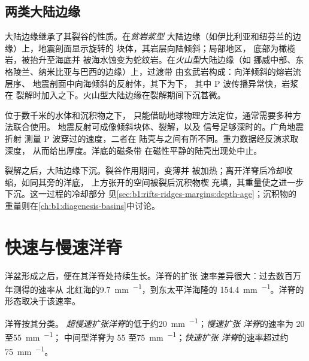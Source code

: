 \subsection*{两类大陆边缘}

大陆边缘继承了其裂谷的性质。在\emph{贫岩浆型}
大陆边缘（如伊比利亚和纽芬兰的边缘）上，地震剖面显示旋转的
块体，其岩层向陆倾斜；局部地区，
底部为橄榄岩，被抬升至海底并
被海水蚀变为蛇纹岩。在\emph{火山型}大陆边缘（如
挪威中部、东格陵兰、纳米比亚与巴西的边缘）上，过渡带
由玄武岩构成：向洋倾斜的熔岩流层序、
地震剖面中向海倾斜的反射体，其下为下，
其中 P 波传播异常快，岩浆在
裂解时加入之下。火山型大陆边缘在裂解期间下沉甚微。

\begin{inthefield}[寻找大陆的边缘]
位于数千米的水体和沉积物之下，
只能借助地球物理方法定位，通常需要多种方法联合使用。
地震反射可成像倾斜块体、裂解，以及
信号足够深时的。广角地震折射
测量 P 波穿过的速度，二者在
陆壳与之间有所不同。重力数据经反演求取深度，
从而给出厚度。洋底的磁条带
在磁性平静的陆壳出现处中止。
\end{inthefield}

裂解之后，大陆边缘下沉。裂谷作用期间，变薄并
被加热；离开洋脊后冷却收缩，如同其旁的洋底，
上方张开的空间被裂后沉积物楔
充填，其重量使之进一步下沉。这一过程的冷却部分
见\cref{sec:b1:rifts-ridges-margins:depth-age}；沉积物的
重量则在\cref{ch:b1:diagenesis-basins}中讨论。

\section{快速与慢速洋脊}

洋盆形成之后，便在其洋脊处持续生长。洋脊的扩张
速率差异很大：过去数百万年测得的速率从
北红海的\qty{9.7}{mm.^{-1}}，到东太平洋海隆的
\qty{154.4}{mm.^{-1}}。洋脊的形态取决于该速率。

\begin{definition}[快速、慢速与超慢速扩张洋脊]\label{def:b1:rifts-ridges-margins:ridge-classes}
洋脊按其分类。
\emph{超慢速扩张洋脊}的低于约\qty{20}{mm.^{-1}}；\emph{慢速扩张
洋脊}的速率为 20 至\qty{55}{mm.^{-1}}；
中间型洋脊为 55 至\qty{75}{mm.^{-1}}；\emph{快速扩张
洋脊}的速率超过约
\qty{75}{mm.^{-1}}。
\end{definition}

